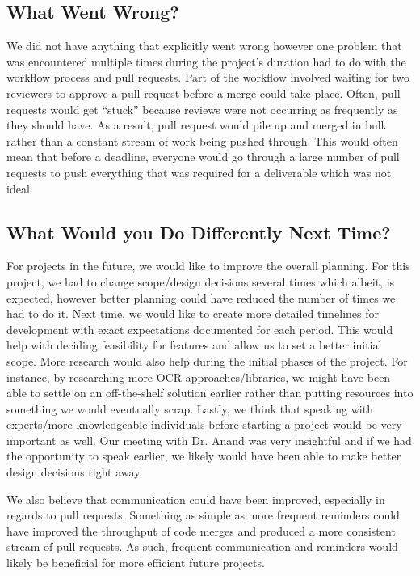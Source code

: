 \documentclass{article}
\begin{document}
\subsection{What Went Wrong?}


We did not have anything that explicitly went wrong however one problem that was encountered multiple times during
the project's duration had to do with the workflow process and pull requests. Part of the workflow
involved waiting for two reviewers to approve a pull request before a merge could take place. Often,
pull requests would get ``stuck'' because reviews were not occurring as frequently
as they should have. As a result, pull request would pile up and merged in bulk rather than a constant stream
of work being pushed through. This would often mean that before a deadline, everyone would go through
a large number of pull requests to push everything that was required for a deliverable which was not ideal.

\subsection{What Would you Do Differently Next Time?}


For projects in the future, we would like to improve the overall planning. For this project, we had to change scope/design decisions several
times which albeit, is expected, however better planning could have reduced the number of
times we had to do it. Next time, we would like to create more detailed timelines for development with exact
expectations documented for each period. This would help with deciding feasibility for features and allow us
to set a better initial scope. More research would also help during the initial phases of the project.
For instance, by researching more OCR approaches/libraries, we might have been able to settle on an off-the-shelf solution
earlier rather than putting resources into something we would eventually scrap. Lastly, we think that speaking with experts/more
knowledgeable individuals before starting a project would be very important as well. Our meeting with Dr. Anand was very insightful
and if we had the opportunity to speak earlier, we likely would have been able to make better design decisions right away.

We also believe that communication could have been improved, especially in regards to pull requests.
Something as simple as more frequent reminders could have improved the throughput of code merges and produced a more
consistent stream of pull requests. As such, frequent communication and reminders would likely be beneficial for more efficient future
projects.
\end{document}
